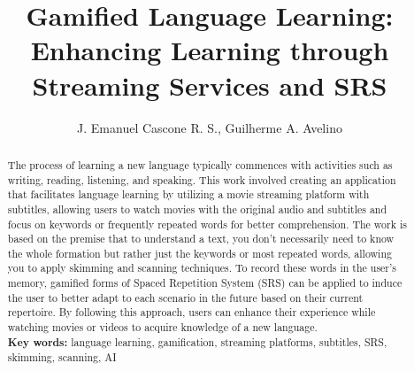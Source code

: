 \documentclass[12pt]{article}
\title{Gamified Language Learning: Enhancing Learning through Streaming Services and SRS}
\author{J. Emanuel Cascone R. S.\inst{1}, Guilherme A. Avelino\inst{1} }
\begin{document}
 

\maketitle

\begin{abstract} 
 The process of learning a new language typically commences with activities such as writing, reading, listening, and speaking. This work involved creating an application that facilitates language learning by utilizing a movie streaming platform with subtitles, allowing users to watch movies with the original audio and subtitles and focus on keywords or frequently repeated words for better comprehension. The work is based on the premise that to understand a text, you don't necessarily need to know the whole formation but rather just the keywords or most repeated words, allowing you to apply skimming and scanning techniques. To record these words in the user's memory, gamified forms of Spaced Repetition System (SRS) can be applied to induce the user to better adapt to each scenario in the future based on their current repertoire. By following this approach, users can enhance their experience while watching movies or videos to acquire knowledge of a new language. \\
  \textbf{Key words:} language learning, gamification, streaming platforms, subtitles, SRS, skimming, scanning, AI
\end{abstract} 
\end{document}

